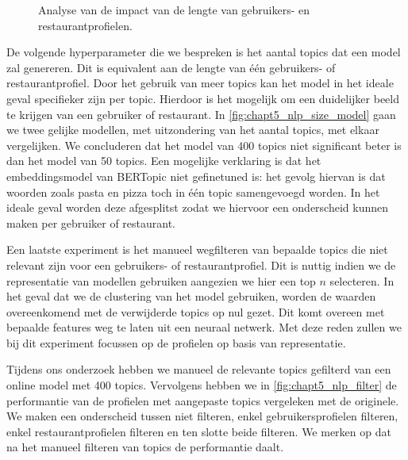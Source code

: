 \begin{figure}[H]
        \caption{Analyse van de impact van de lengte van gebruikers- en restaurantprofielen.}
        \label{fig:chapt5_nlp_size_model}
\end{figure}

De volgende hyperparameter die we bespreken is het aantal topics dat een model zal genereren. Dit is equivalent aan de lengte van één gebruikers- of restaurantprofiel. Door het gebruik van meer topics kan het model in het ideale geval specifieker zijn per topic. Hierdoor is het mogelijk om een duidelijker beeld te krijgen van een gebruiker of restaurant. In \autoref{fig:chapt5_nlp_size_model} gaan we twee gelijke modellen, met uitzondering van het aantal topics, met elkaar vergelijken. We concluderen dat het model van 400 topics niet significant beter is dan het model van 50 topics. Een mogelijke verklaring is dat het embeddingsmodel van BERTopic niet gefinetuned is: het gevolg hiervan is dat woorden zoals pasta en pizza toch in één topic samengevoegd worden. In het ideale geval worden deze afgesplitst zodat we hiervoor een onderscheid kunnen maken per gebruiker of restaurant.

Een laatste experiment is het manueel wegfilteren van bepaalde topics die niet relevant zijn voor een gebruikers- of restaurantprofiel. Dit is nuttig indien we de representatie van modellen gebruiken aangezien we hier een top $n$ selecteren. In het geval dat we de clustering van het model gebruiken, worden de waarden overeenkomend met de verwijderde topics op nul gezet. Dit komt overeen met bepaalde features weg te laten uit een neuraal netwerk. Met deze reden zullen we bij dit experiment focussen op de profielen op basis van representatie. \\


Tijdens ons onderzoek hebben we manueel de relevante topics gefilterd van een online model met 400 topics. Vervolgens hebben we in \autoref{fig:chapt5_nlp_filter} de performantie van de profielen met aangepaste topics vergeleken met de originele. We maken een onderscheid tussen niet filteren, enkel gebruikersprofielen filteren, enkel restaurantprofielen filteren en ten slotte beide filteren. We merken op dat na het manueel filteren van topics de performantie daalt.

